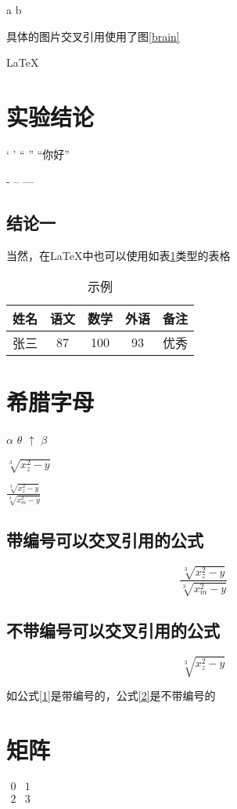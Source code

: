 \documentclass{ctexart}
\begin{document}
	a \hfill b
	
具体的图片交叉引用使用了图\ref{brain}



	
     \LaTeX{}
\section{实验结论}
	` ' `` '' ``你好''
	
	- -- ---	

\subsection{结论一}
当然，在\LaTeX 中也可以使用如表\ref{exampletable}类型的表格
\begin{table}[htbp]%
	\centering
	\caption{示例}\label{exampletable}
	\begin{tabular}{|c|c|c|c|p{1.5cm}|}%
		\hline
		姓名 & 语文 & 数学 & 外语 & 备注 \\
		\hline
		张三 & 87 & 100 & 93 & 优秀 \\
		\hline
	\end{tabular}
\end{table}
\section{希腊字母}
$\alpha$ $\theta$ $\uparrow$ $\beta$

$\sqrt[3]{x^2_{z}-y}$

$\frac{\sqrt[3]{x^2_{z}-y}}{\sqrt[3]{x^2_{m}-y}}$
\subsection{带编号可以交叉引用的公式}
\begin{equation}\label{1}
	\frac{\sqrt[3]{x^2_{z}-y}}{\sqrt[3]{x^2_{m}-y}}
\end{equation}

\subsection{不带编号可以交叉引用的公式}
\begin{equation*}\label{2}
	\sqrt[3]{x^2_{z}-y}
\end{equation*}

如公式\ref{1}是带编号的，公式\ref{2}是不带编号的

\section{矩阵}
$\begin{array}{cc}
	0 & 1 \\
	2 & 3
\end{array}$
\end{document}
